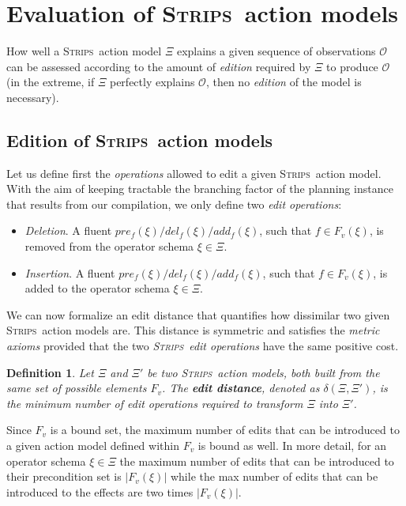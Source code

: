 \documentclass{article}
\newcommand{\strips}{\textsc{Strips}}     %
\newtheorem{definition}[theorem]{Definition}
\begin{document}
\section{Evaluation of \strips\ action models}
How well a \strips\ action model $\Xi$ explains a given sequence of observations $\mathcal{O}$ can be assessed according to the amount of {\em edition} required by $\Xi$ to produce $\mathcal{O}$ (in the extreme, if $\Xi$ perfectly explains $\mathcal{O}$, then no {\em edition} of the model is necessary).

\subsection{Edition of \strips\ action models}
Let us define first the \emph{operations} allowed to edit a given \strips\ action model. With the aim of keeping tractable the branching factor of the planning instance that results from our compilation, we only define two {\em edit operations}:
\begin{itemize}
\item {\em Deletion}. A fluent $pre_f(\xi)/del_f(\xi)/add_f(\xi)$, such that $f\in F_v(\xi)$, is removed from the operator schema $\xi\in\Xi$.
\item {\em Insertion}. A fluent $pre_f(\xi)/del_f(\xi)/add_f(\xi)$, such that $f\in F_v(\xi)$, is added to the operator schema $\xi\in\Xi$.
\end{itemize}

We can now formalize an edit distance that quantifies how dissimilar two given \strips\ action models are. This distance is symmetric and satisfies the {\em metric axioms} provided that the two {\em \strips\ edit operations} have the same positive cost.

\begin{definition}
Let $\Xi$ and $\Xi'$ be two \strips\ action models, both built from the same set of possible elements $F_v$. The {\bf edit distance}, denoted as $\delta(\Xi,\Xi')$, is the minimum number of {\em edit operations} required to transform $\Xi$ into $\Xi'$.
\end{definition}

Since $F_v$ is a bound set, the maximum number of edits that can be introduced to a given action model defined within $F_v$ is bound as well. In more detail, for an operator schema $\xi\in\Xi$ the maximum number of edits that can be introduced to their precondition set is $|F_v(\xi)|$ while the max number of edits that can be introduced to the effects are two times $|F_v(\xi)|$.
\end{document}
